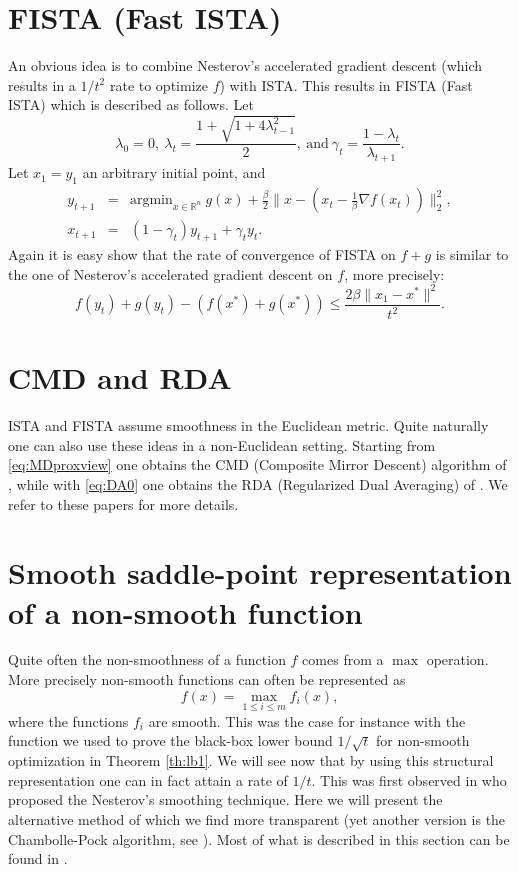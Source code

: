 \documentclass[openany]{now}
\begin{document}
\section*{FISTA (Fast ISTA)}
An obvious idea is to combine Nesterov's accelerated gradient descent (which results in a $1/t^2$ rate to optimize $f$) with ISTA. This results in FISTA (Fast ISTA) which is described as follows. Let
$$\lambda_0 = 0, \ \lambda_{t} = \frac{1 + \sqrt{1+ 4 \lambda_{t-1}^2}}{2}, \ \text{and} \  \gamma_t = \frac{1 - \lambda_t}{\lambda_{t+1}}.$$
Let $x_1 = y_1$ an arbitrary initial point, and
\begin{eqnarray*}
y_{t+1} & = & \mathrm{argmin}_{x \in \mathbb{R}^n} \ g(x) + \frac{\beta}{2} \|x - (x_t - \frac1{\beta} \nabla f(x_t)) \|_2^2 , \\
x_{t+1} & = & (1 - \gamma_t) y_{t+1} + \gamma_t y_t .
\end{eqnarray*}
Again it is easy show that the rate of convergence of FISTA on $f+g$ is similar to the one of Nesterov's accelerated gradient descent on $f$, more precisely:
$$f(y_t) + g(y_t) - (f(x^*) + g(x^*)) \leq \frac{2 \beta \|x_1 - x^*\|^2}{t^2} .$$

\section*{CMD and RDA}
ISTA and FISTA assume smoothness in the Euclidean metric. Quite naturally one can also use these ideas in a non-Euclidean setting. Starting from \eqref{eq:MDproxview} one obtains the CMD (Composite Mirror Descent) algorithm of \cite{DSSST10}, while with \eqref{eq:DA0} one obtains the RDA (Regularized Dual Averaging) of \cite{Xia10}. We refer to these papers for more details.

\section{Smooth saddle-point representation of a non-smooth function} \label{sec:sprepresentation}
Quite often the non-smoothness of a function $f$ comes from a $\max$ operation. More precisely non-smooth functions can often be represented as
\begin{equation} \label{eq:sprepresentation}
f(x) = \max_{1 \leq i \leq m} f_i(x) ,
\end{equation}
where the functions $f_i$ are smooth. This was the case for instance with the function we used to prove the black-box lower bound $1/\sqrt{t}$ for non-smooth optimization in Theorem \ref{th:lb1}. We will see now that by using this structural representation one can in fact attain a rate of $1/t$. This was first observed in \cite{Nes04b} who proposed the Nesterov's smoothing technique. Here we will present the alternative method of \cite{Nem04} which we find more transparent (yet another version is the Chambolle-Pock algorithm, see \cite{CP11}). Most of what is described in this section can be found in \cite{JN11a, JN11b}.
\end{document}
